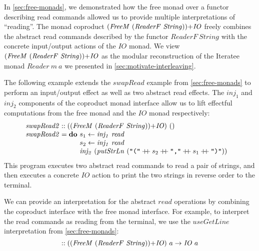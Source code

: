 \documentclass{jfp1}
\newcommand{\fmext}[1]{\langle\kern-0.25em\langle #1 \rangle\kern-0.25em\rangle}
\newcommand{\kw}[1]{\textbf{#1}}
\begin{document}
In \autoref{sec:free-monads}, we demonstrated how the free monad over
a functor describing read commands allowed us to provide multiple
interpretations of ``reading''. 
The monad coproduct
$(\mathit{FreeM}~(\mathit{ReaderF}~\mathit{String}))\mathord{+}\mathit{IO}$
freely combines the abstract read commands described by the functor
$\mathit{ReaderF}~\mathit{String}$ with the concrete input/output
actions of the $\mathit{IO}$ monad. We view
$(\mathit{FreeM}~(\mathit{ReaderF}~\mathit{String}))\mathord{+}\mathit{IO}$
as the modular reconstruction of the Iteratee monad
$\mathit{Reader}~m~a$ we presented in
\autoref{sec:motivate-interleaving}.

The following example extends the $\mathit{swapRead}$ example from
\autoref{sec:free-monads} to perform an input/output effect as well as
two abstract read effects.  The $\mathit{inj_1}$ and $\mathit{inj_2}$
components of the coproduct monad interface allow us to lift effectful
computations from the free monad and the $\mathit{IO}$ monad respectively:
\begin{displaymath}
  \begin{array}{@{}l}
    \mathit{swapRead2} :: (\cprd{(\mathit{FreeM}~(\mathit{ReaderF}~\mathit{String}))}{\mathit{IO}})~() \\
    \mathit{swapRead2} = \kw{do}~
    \begin{array}[t]{@{}l}
      s_1 \leftarrow \mathit{inj_1}~\mathit{read} \\
      s_2 \leftarrow \mathit{inj_1}~\mathit{read} \\
      \mathit{inj_2}~(\mathit{putStrLn}~(\texttt{"("} \dplus s_2 \dplus \texttt{","} \dplus s_1 \dplus \texttt{")"}))
    \end{array}
  \end{array}
\end{displaymath}
This program executes two abstract read commands to read a pair of
strings, and then executes a concrete $\mathit{IO}$ action to print
the two strings in reverse order to the terminal.


We can provide an interpretation for the abstract $\mathit{read}$
operations by combining the coproduct interface with the free monad
interface. For example, to interpret the read commands as reading from
the terminal, we use the $\mathit{useGetLine}$ interpretation from
\autoref{sec:free-monads}:
\begin{displaymath}
  [\fmext{\mathit{useGetLine}}, \mathit{id}] :: (\cprd{(\mathit{FreeM}~(\mathit{ReaderF}~\mathit{String}))}{\mathit{IO}})~a \to \mathit{IO}~a
\end{displaymath}
\end{document}
